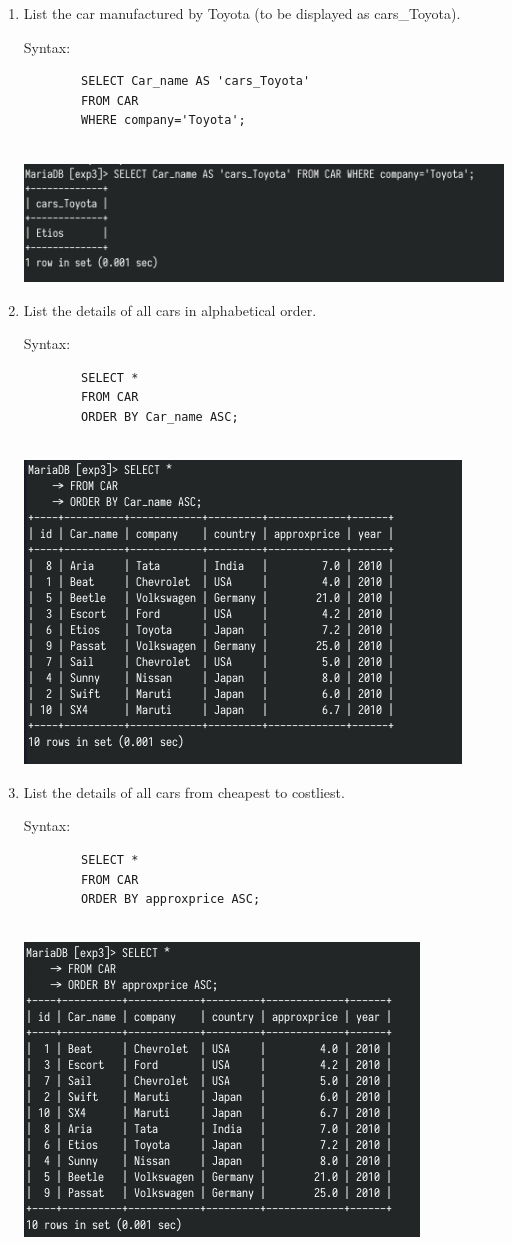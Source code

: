 \documentclass[13pt,oneside]{book}
\begin{document}
\begin{enumerate}
		
		\item
		List the car manufactured by Toyota (to be displayed as cars\_Toyota).
		 
		Syntax:
		\begin{verbatim}
		SELECT Car_name AS 'cars_Toyota'
		FROM CAR
		WHERE company='Toyota';
		
		\end{verbatim}
		\includegraphics[]{img/p3/ss11.png}
		
		
		\item
		List the details of all cars in alphabetical order.
		 
		Syntax:
		\begin{verbatim}
		SELECT *
		FROM CAR
		ORDER BY Car_name ASC;
		
		\end{verbatim}
		\includegraphics[]{img/p3/ss12.png}
		
		
		\item
		List the details of all cars from cheapest to costliest.
		
		Syntax:
		\begin{verbatim}
		SELECT *
		FROM CAR
		ORDER BY approxprice ASC;
		
		\end{verbatim}
		\includegraphics[]{img/p3/ss13.png}
			\end{enumerate}
\end{document}
